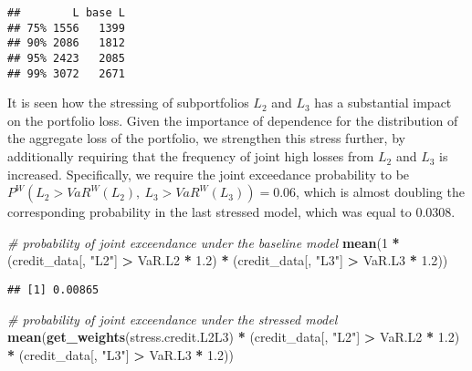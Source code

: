 \documentclass[
]{article}
\newenvironment{Shaded}{\begin{snugshade}}{\end{snugshade}}
\newcommand{\CommentTok}[1]{\textcolor[rgb]{0.56,0.35,0.01}{\textit{#1}}}
\newcommand{\DecValTok}[1]{\textcolor[rgb]{0.00,0.00,0.81}{#1}}
\newcommand{\FloatTok}[1]{\textcolor[rgb]{0.00,0.00,0.81}{#1}}
\newcommand{\KeywordTok}[1]{\textcolor[rgb]{0.13,0.29,0.53}{\textbf{#1}}}
\newcommand{\NormalTok}[1]{#1}
\newcommand{\OperatorTok}[1]{\textcolor[rgb]{0.81,0.36,0.00}{\textbf{#1}}}
\newcommand{\StringTok}[1]{\textcolor[rgb]{0.31,0.60,0.02}{#1}}
\begin{document}
\begin{verbatim}
##        L base L
## 75% 1556   1399
## 90% 2086   1812
## 95% 2423   2085
## 99% 3072   2671
\end{verbatim}

It is seen how the stressing of subportfolios \(L_2\) and \(L_3\) has a substantial impact on the portfolio loss. Given the importance of dependence for the distribution of the aggregate loss of the portfolio, we strengthen this stress further, by additionally requiring that the frequency of joint high losses from \(L_2\) and \(L_3\) is increased. Specifically, we require the joint exceedance probability to be \(P^W(L_2 > VaR^W(L_2),~ L_3 > VaR^W(L_3)) = 0.06\), which is almost doubling the corresponding probability in the last stressed model, which was equal to 0.0308.

\begin{Shaded}
\begin{Highlighting}[]
\CommentTok{# probability of joint exceendance under the baseline model}
\KeywordTok{mean}\NormalTok{(}\DecValTok{1} \OperatorTok{*}\StringTok{ }\NormalTok{(credit_data[, }\StringTok{"L2"}\NormalTok{] }\OperatorTok{>}\StringTok{ }\NormalTok{VaR.L2 }\OperatorTok{*}\StringTok{ }\FloatTok{1.2}\NormalTok{) }\OperatorTok{*}\StringTok{ }\NormalTok{(credit_data[, }\StringTok{"L3"}\NormalTok{] }\OperatorTok{>}\StringTok{ }
\StringTok{    }\NormalTok{VaR.L3 }\OperatorTok{*}\StringTok{ }\FloatTok{1.2}\NormalTok{))}
\end{Highlighting}
\end{Shaded}

\begin{verbatim}
## [1] 0.00865
\end{verbatim}

\begin{Shaded}
\begin{Highlighting}[]
\CommentTok{# probability of joint exceendance under the stressed model}
\KeywordTok{mean}\NormalTok{(}\KeywordTok{get_weights}\NormalTok{(stress.credit.L2L3) }\OperatorTok{*}\StringTok{ }\NormalTok{(credit_data[, }\StringTok{"L2"}\NormalTok{] }\OperatorTok{>}\StringTok{ }\NormalTok{VaR.L2 }\OperatorTok{*}\StringTok{ }
\StringTok{    }\FloatTok{1.2}\NormalTok{) }\OperatorTok{*}\StringTok{ }\NormalTok{(credit_data[, }\StringTok{"L3"}\NormalTok{] }\OperatorTok{>}\StringTok{ }\NormalTok{VaR.L3 }\OperatorTok{*}\StringTok{ }\FloatTok{1.2}\NormalTok{))}
\end{Highlighting}
\end{Shaded}
\end{document}
